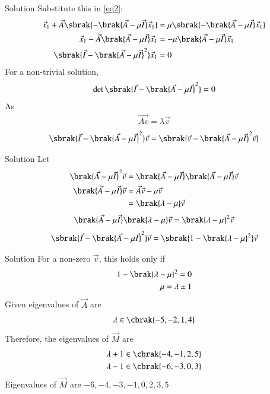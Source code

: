 \documentclass{beamer}
\begin{document}
\begin{frame}{Solution}
Substitute this in \eqref{eq2}:
\begin{align}
\vec{x}_1 + \vec{A}\sbrak{-\brak{\vec{A} - \mu \vec{I}}\vec{x}_1} 
&= \mu \sbrak{-\brak{\vec{A} - \mu \vec{I}}\vec{x}_1}\\
\vec{x}_1 - \vec{A}\brak{\vec{A} - \mu \vec{I}}\vec{x}_1 
&= -\mu\brak{\vec{A} - \mu \vec{I}}\vec{x}_1\\
\sbrak{\vec{I} - \brak{\vec{A} - \mu \vec{I}}^2}\vec{x}_1 &= 0
\end{align}
For a non-trivial solution, 
\begin{align}
    \det\sbrak{\vec{I} - \brak{\vec{A} - \mu \vec{I}}^2} = 0
\end{align}
As
\begin{align}
    \vec{Av}=\lambda \vec{v}
\end{align}
\begin{align}
    \sbrak{\vec{I} - \brak{\vec{A} - \mu \vec{I}}^2}\vec{v} = \sbrak{\vec{v} - \brak{\vec{A} - \mu \vec{I}}^2 \vec{v}} 
\end{align}
\end{frame}

\begin{frame}{Solution}
Let 
\begin{align}
    \brak{\vec{A} - \mu \vec{I}}^2 \vec{v} &= \brak{\vec{A} - \mu \vec{I}} \brak{\vec{A} - \mu \vec{I}} \vec{v}\\
    \brak{\vec{A} - \mu \vec{I}} \vec{v} &= \vec{A} \vec{v} - \mu \vec{v}\\
    &= \brak{\lambda - \mu } \vec{v}
\end{align} 
\begin{align}
    \brak{\vec{A} - \mu \vec{I}} \brak{\lambda - \mu } \vec{v} = \brak{\lambda - \mu}^2 \vec{v}
\end{align}
\begin{align}
    \sbrak{\vec{I} - \brak{\vec{A} - \mu \vec{I}}^2}\vec{v}
= \sbrak{1 - \brak{\lambda - \mu}^2}\vec{v}
\end{align}
\end{frame}

\begin{frame}{Solution}
For a non-zero $\vec{v}$, this holds only if 
\begin{align}
    1 - \brak{\lambda - \mu}^2 = 0\\
    \mu = \lambda \pm 1
\end{align}
Given eigenvalues of $\vec{A}$ are 
\begin{align}
    \lambda \in \cbrak{-5, -2, 1, 4}
\end{align}
Therefore, the eigenvalues of $\vec{M}$ are
\begin{align}
    \lambda + 1 &\in \cbrak{-4, -1, 2, 5}\\
\lambda - 1 &\in \cbrak{-6, -3, 0, 3}
\end{align}
Eigenvalues of $\vec{M}$ are $-6,-4,-3,-1,0,2,3,5$
\end{frame}
\end{document}
